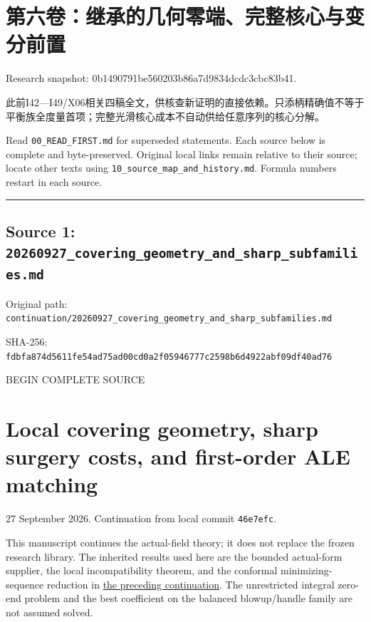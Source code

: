 \documentclass[
  10pt,
]{article}
\author{}
\date{}
\begin{document}
\hypertarget{ux7b2cux516dux5377ux7ee7ux627fux7684ux51e0ux4f55ux96f6ux7aefux5b8cux6574ux6838ux5fc3ux4e0eux53d8ux5206ux524dux7f6e}{%
\section{第六卷：继承的几何零端、完整核心与变分前置}\label{ux7b2cux516dux5377ux7ee7ux627fux7684ux51e0ux4f55ux96f6ux7aefux5b8cux6574ux6838ux5fc3ux4e0eux53d8ux5206ux524dux7f6e}}

Research snapshot: 0b1490791be560203b86a7d9834dcdc3cbc83b41.

此前I42---I49/X06相关四稿全文，供核查新证明的直接依赖。只添柄精确值不等于平衡族全度量首项；完整光滑核心成本不自动供给任意序列的核心分解。

Read \nolinkurl{00_READ_FIRST.md} for superseded statements. Each source below is
complete and byte-preserved. Original local links remain relative to
their source; locate other texts using \nolinkurl{10_source_map_and_history.md}.
Formula numbers restart in each source.

\begin{center}\rule{0.5\linewidth}{0.5pt}\end{center}

\hypertarget{source-1-20260927_covering_geometry_and_sharp_subfamilies.md}{%
\subsection{Source 1:
\nolinkurl{20260927_covering_geometry_and_sharp_subfamilies.md}}\label{source-1-20260927_covering_geometry_and_sharp_subfamilies.md}}

Original path:
\nolinkurl{continuation/20260927_covering_geometry_and_sharp_subfamilies.md}

SHA-256:
\nolinkurl{fdbfa874d5611fe54ad75ad00cd0a2f05946777c2598b6d4922abf09df40ad76}

BEGIN COMPLETE SOURCE

\hypertarget{local-covering-geometry-sharp-surgery-costs-and-first-order-ale-matching}{%
\section{Local covering geometry, sharp surgery costs, and first-order
ALE
matching}\label{local-covering-geometry-sharp-surgery-costs-and-first-order-ale-matching}}

27 September 2026. Continuation from local commit \texttt{46e7efc}.

This manuscript continues the actual-field theory; it does not replace
the frozen research library. The inherited results used here are the
bounded actual-form supplier, the local incompatibility theorem, and the
conformal minimizing-sequence reduction in
\href{20260927_conformal_separation_and_zero_end.md}{the preceding
continuation}. The unrestricted integral zero-end problem and the best
coefficient on the balanced blowup/handle family are not assumed solved.
\end{document}
